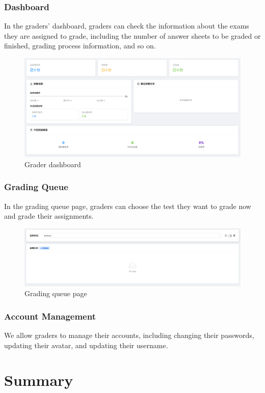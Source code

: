 \documentclass[12pt]{article}
\begin{document}
\subsubsection{Dashboard}
In the graders' dashboard, graders can check the information about the exams they are assigned to grade, including the number of answer sheets to be graded or finished,
grading process information, and so on.
\begin{figure}[H]
    \centering
    \includegraphics[width=\textwidth]{grader/dashboard.png}
    \caption{Grader dashboard}
    \label{fig:GraderDashboard page}
\end{figure}
\subsubsection{Grading Queue}
In the grading queue page, graders can choose the test they want to grade now and grade their assignments.
\begin{figure}[H]
    \centering
    \includegraphics[width=\textwidth]{grader/queue.png}
    \caption{Grading queue page}
    \label{fig:GradingQueue page}
\end{figure}
\subsubsection{Account Management}
We allow graders to manage their accounts, including changing their passwords, updating their avatar, and updating their username.

\section{Summary}
\end{document}
